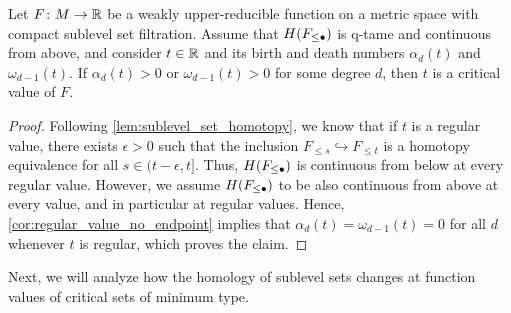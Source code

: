 \begin{lem}
\label{lem:endpoint_implies_crit_pt}
	Let $F \colon M \to \mathbb{R}$ be a weakly upper-reducible function on a metric space with compact sublevel set filtration.
	Assume that $H(F_{\leq \bullet})$ is q-tame and continuous from above, and consider $t \in \mathbb{R}$ and its birth and death numbers $\alpha_d(t)$ and $\omega_{d-1}(t)$.
	If $\alpha_d(t) > 0$ or $\omega_{d-1}(t) > 0$ for some degree $d$, then $t$ is a critical value of $F$.
\end{lem}
\begin{proof}
	Following \cref{lem:sublevel_set_homotopy}, we know that if $t$ is a regular value, there exists $\epsilon > 0$ such that the inclusion $F_{\leq s} \hookrightarrow F_{\leq t}$ is a homotopy equivalence for all $s \in (t - \epsilon, t]$.
	Thus, $H(F_{\leq \bullet})$ is continuous from below at every regular value.
	However, we assume $H(F_{\leq \bullet})$ to be also continuous from above at every value, and in particular at regular values.
	Hence, \cref{cor:regular_value_no_endpoint} implies that $\alpha_d(t) = \omega_{d-1}(t) = 0$ for all $d$ whenever $t$ is regular, which proves the claim.
\end{proof}




Next, we will analyze how the homology of sublevel sets changes at function values of critical sets of minimum type.

